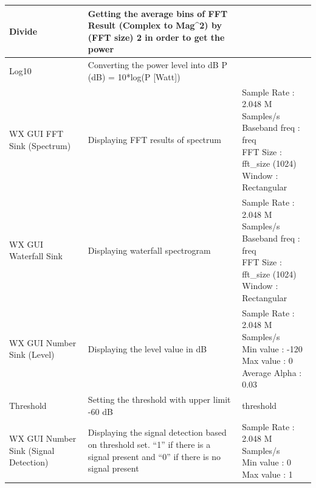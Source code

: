 \begin{table}[h]
{\begin{tabular}{|p{}|p{}|p{}|}
Divide                                    & Getting the average bins of FFT Result (Complex to Mag\textasciicircum 2) by (FFT size) 2 in order to get the power                         &                                                                                                          \\ \hline
Log10                                     & Converting the power level into dB P (dB) = 10*log(P {[}Watt{]})                                                                            &                                                                                                          \\ \hline
WX GUI FFT Sink (Spectrum)                & Displaying FFT results of spectrum                                                                                                          & \makecell[lt]{Sample Rate : 2.048 M Samples/s \\ Baseband freq : freq \\ FFT Size : fft\_size (1024) \\ Window : Rectangular} \\ \hline
WX GUI Waterfall Sink                     & Displaying waterfall spectrogram                                                                                                            & \makecell[lt]{Sample Rate : 2.048 M Samples/s \\ Baseband freq : freq \\ FFT Size : fft\_size (1024) \\ Window : Rectangular} \\ \hline
WX GUI Number Sink (Level)                & Displaying the level value in dB                                                                                                            & \makecell[lt]{Sample Rate : 2.048 M Samples/s \\ Min value : -120 \\ Max value : 0 \\ Average Alpha : 0.03}                   \\ \hline
Threshold                                 & Setting the threshold with upper limit -60 dB                                                                                               & threshold                                                                                                \\ \hline
WX GUI Number Sink (Signal Detection)     & Displaying the signal detection based on threshold set. “1” if there is a signal present and “0” if there is no signal present              & \makecell[lt]{Sample Rate : 2.048 M Samples/s \\ Min value : 0 \\ Max value : 1}                                            \\ \hline

\end{tabular}}
\end{table}
